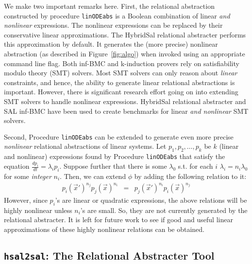 \documentclass{llncs}
\def\linODEabs{\tt{linODEabs}}
\newcommand\ignore[1]{{}}
\begin{document}
We make two important remarks here.
First,
the relational abstraction constructed by 
procedure {\linODEabs} is a Boolean combination
of linear {\em{and nonlinear}} expressions.
The nonlinear expressions can be replaced by their
conservative linear approximations.  The
HybridSal relational abstracter performs this approximation
by default.  It generates the (more precise)
nonlinear abstraction (as described in Figure~\ref{fig:algo})
when invoked using an appropriate command line flag.
Both inf-BMC and k-induction
provers rely on satisfiability modulo theory (SMT) solvers.
Most SMT solvers can only reason %
about {\em{linear}} constraints, and hence, the ability to
generate linear relational abstractions is important.
However, there is significant research effort going on
into extending SMT solvers to handle nonlinear expressions.
HybridSal relational abstracter and SAL inf-BMC 
have been used to create benchmarks for 
linear {\em{and nonlinear}} SMT solvers.

Second, Procedure {\linODEabs} can be extended to
generate even more precise {\em{nonlinear}}
relational abstractions of linear systems.
Let $p_1, p_2, \ldots, p_k$ be $k$ (linear and nonlinear)
expressions found by Procedure {\linODEabs} that 
satisfy the equation $\frac{dp_i}{dt} = \lambda_i p_i$.
Suppose further that 
there is some $\lambda_0$ s.t.
for each $i$
$\lambda_i = n_i \lambda_0$ for some {\em{integer}} $n_i$.
Then, we can extend $\phi$ by adding the following relation to it:
\begin{eqnarray}
 p_i(\vec{x}')^{n_j} p_j(\vec{x})^{n_i}
 & = & p_j(\vec{x}')^{n_i}  p_i(\vec{x})^{n_j}
\label{eqn:nl}
\end{eqnarray}
\ignore{
The above relationship holds for any binary reachable
pair of states $(\vec{x},\vec{x'})$ 
because
$$
 \left(\frac{p_i(\vec{x}')}{p_i(\vec{x})}\right)^{n_j} 
 = 
 \left(\frac{p_j(\vec{x}')}{p_j(\vec{x})}\right)^{n_i} 
 =
 e^{n_in_j\lambda_0 t}
$$
\endignore}
However, since $p_i$'s are linear or quadratic 
expressions, the above relations will be highly
nonlinear unless $n_i$'s are small.  So, they are
not currently generated by the relational abstracter.
It is left for future work to see if good and useful
linear approximations of these highly nonlinear relations
can be obtained.

\subsection{{\tt{hsal2sal}}: The Relational Abstracter Tool}
\end{document}
